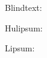 \documentclass{article}
\begin{document}
Blindtext:
\blindtext


Hulipsum:
\raggedleft{\hulipsum[1]}

Lipsum:
\linespread{1.6}\selectfont{{\lipsum[1]}}
\end{document}
